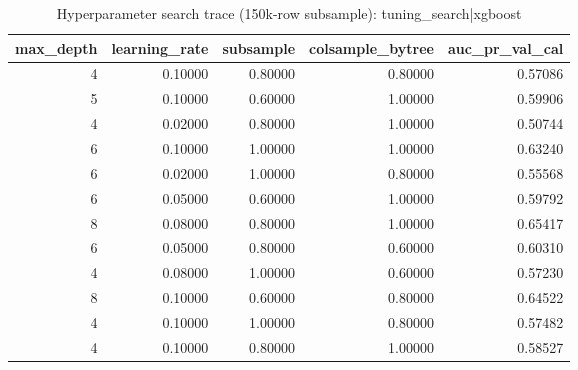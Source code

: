 \begin{table}
\caption{Hyperparameter search trace (150k-row subsample): tuning_search|xgboost}
\label{tab:table14_hp_search_xgboost}
\begin{tabular}{rrrrr}
\toprule
max\_depth & learning\_rate & subsample & colsample\_bytree & auc\_pr\_val\_cal \\
\midrule
4 & 0.10000 & 0.80000 & 0.80000 & 0.57086 \\
5 & 0.10000 & 0.60000 & 1.00000 & 0.59906 \\
4 & 0.02000 & 0.80000 & 1.00000 & 0.50744 \\
6 & 0.10000 & 1.00000 & 1.00000 & 0.63240 \\
6 & 0.02000 & 1.00000 & 0.80000 & 0.55568 \\
6 & 0.05000 & 0.60000 & 1.00000 & 0.59792 \\
8 & 0.08000 & 0.80000 & 1.00000 & 0.65417 \\
6 & 0.05000 & 0.80000 & 0.60000 & 0.60310 \\
4 & 0.08000 & 1.00000 & 0.60000 & 0.57230 \\
8 & 0.10000 & 0.60000 & 0.80000 & 0.64522 \\
4 & 0.10000 & 1.00000 & 0.80000 & 0.57482 \\
4 & 0.10000 & 0.80000 & 1.00000 & 0.58527 \\
\bottomrule
\end{tabular}
\end{table}
